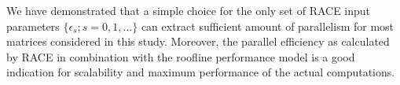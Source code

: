 We have demonstrated that a simple choice for the only set of RACE input parameters $\{\epsilon_s; s=0,1,\ldots\}$ can extract sufficient amount of parallelism for most matrices considered in this study. Moreover, the parallel efficiency as calculated by RACE in combination with the roofline performance model is a good indication for scalability and maximum performance of the actual computations.

